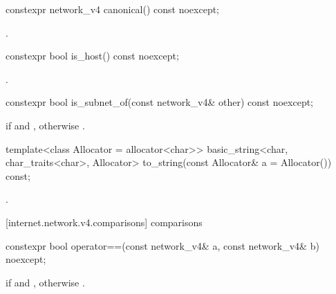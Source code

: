 \begin{itemdecl}
constexpr network_v4 canonical() const noexcept;
\end{itemdecl}

\begin{itemdescr}
\pnum
\returns {}.
\end{itemdescr}

\begin{itemdecl}
constexpr bool is_host() const noexcept;
\end{itemdecl}

\begin{itemdescr}
\pnum
\returns {}.
\end{itemdescr}

\begin{itemdecl}
constexpr bool is_subnet_of(const network_v4& other) const noexcept;
\end{itemdecl}

\begin{itemdescr}
\pnum
\returns {} if  and , otherwise .
\end{itemdescr}

\begin{itemdecl}
template<class Allocator = allocator<char>>
  basic_string<char, char_traits<char>, Allocator>
    to_string(const Allocator& a = Allocator()) const;
\end{itemdecl}

\begin{itemdescr}
\pnum
\returns {}.
\end{itemdescr}



[internet.network.v4.comparisons]{ comparisons}

\begin{itemdecl}
constexpr bool operator==(const network_v4& a, const network_v4& b) noexcept;
\end{itemdecl}

\begin{itemdescr}
\pnum
\returns {} if  and , otherwise .
\end{itemdescr}

